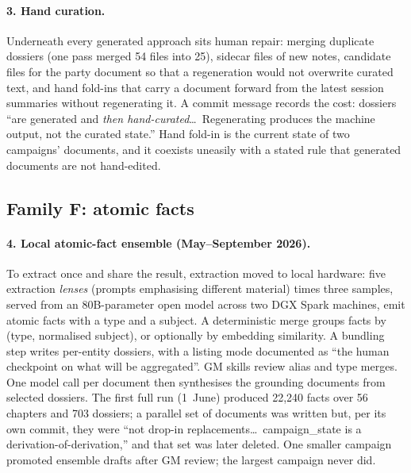 \documentclass[11pt]{article}
\begin{document}
\paragraph{3. Hand curation.}
Underneath every generated approach sits human repair: merging duplicate dossiers (one pass merged 54
files into 25), sidecar files of new notes, candidate files for the party document so that a
regeneration would not overwrite curated text, and hand fold-ins that carry a document forward from
the latest session summaries without regenerating it. A commit message records the cost: dossiers
``are generated and \emph{then hand-curated}\ldots\ Regenerating produces the machine output, not the
curated state.'' Hand fold-in is the current state of two campaigns' documents, and it coexists
uneasily with a stated rule that generated documents are not hand-edited.

\subsection{Family F: atomic facts}

\paragraph{4. Local atomic-fact ensemble (May--September 2026).}
To extract once and share the result, extraction moved to local hardware: five extraction
\emph{lenses} (prompts emphasising different material) times three samples, served from an
80B-parameter open model across two DGX Spark machines, emit atomic facts with a type and a subject.
A deterministic merge groups facts by (type, normalised subject), or optionally by embedding
similarity. A bundling step writes per-entity dossiers, with a listing mode documented as ``the human
checkpoint on what will be aggregated''. GM skills review alias and type merges. One model call per
document then synthesises the grounding documents from selected dossiers. The first full run
(1~June) produced 22{,}240 facts over 56 chapters and 703 dossiers; a parallel set of documents was
written but, per its own commit, they were ``not drop-in replacements\ldots\ campaign\_state is a
derivation-of-derivation,'' and that set was later deleted. One smaller campaign promoted ensemble drafts
after GM review; the largest campaign never did.
\end{document}

